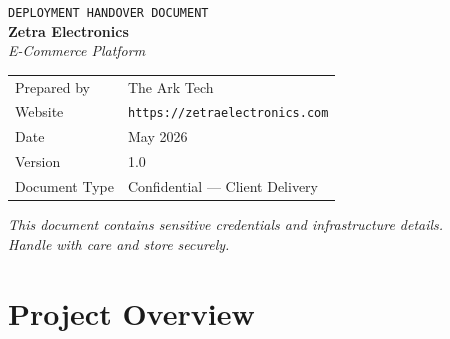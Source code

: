 \documentclass[12pt,a4paper]{article}
\begin{document}

\begin{titlepage}
\pagecolor{darkbg}
\afterpage{\nopagecolor}
\centering
\vspace*{3cm}

{\color{white}\fontsize{11}{14}\selectfont\texttt{DEPLOYMENT HANDOVER DOCUMENT}}\\[1.2cm]

{\color{white}\fontsize{36}{44}\selectfont\bfseries Zetra Electronics}\\[0.4cm]

{\color{primary}\fontsize{16}{20}\selectfont\itshape E-Commerce Platform}\\[2.5cm]


\vspace{2cm}

\begin{tabular}{@{}L{5cm} L{7cm}@{}}
{\color{textgray}\small Prepared by} & {\color{white}\small The Ark Tech} \\[0.4cm]
{\color{textgray}\small Website} & {\color{primary}\small\texttt{https://zetraelectronics.com}} \\[0.4cm]
{\color{textgray}\small Date} & {\color{white}\small May 2026} \\[0.4cm]
{\color{textgray}\small Version} & {\color{white}\small 1.0} \\[0.4cm]
{\color{textgray}\small Document Type} & {\color{white}\small Confidential — Client Delivery} \\
\end{tabular}

\vfill

{\color{textgray}\small\itshape This document contains sensitive credentials and infrastructure details.\\
Handle with care and store securely.}

\end{titlepage}

\newpage
\tableofcontents
\newpage

\section{Project Overview}
\end{document}
